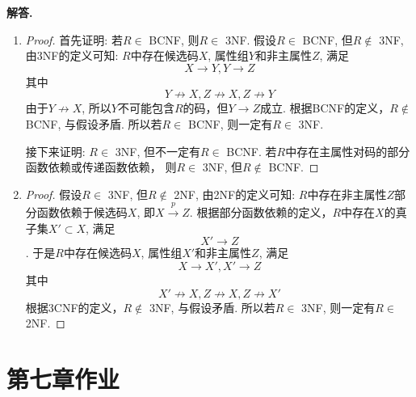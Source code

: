 \documentclass[12pt, oneside]{ctexart}
\numberwithin{figure}{section}
\numberwithin{table}{section}
\newcounter{problemname}
\newenvironment{solution}{\par\noindent\textbf{解答. }}{\par}
\begin{document}
\begin{solution}
        \begin{enumerate}[(1)]
            \item 
                \begin{proof} 
                    首先证明: 若$R\in$ BCNF, 则$R\in$ 3NF.\newline
                    假设$R\in$ BCNF, 但$R\not\in$ 3NF, 由3NF的定义可知:\newline 
                    $R$中存在候选码$X$, 属性组$Y$和非主属性$Z$, 满足
                    $$X \rightarrow Y, Y \rightarrow Z$$
                    其中$$Y \not\rightarrow X, Z \not\rightarrow X, Z \not\rightarrow Y$$
                    由于$Y \not\rightarrow X$, 所以$Y$不可能包含$R$的码，但$Y \rightarrow Z$成立.
                    根据BCNF的定义，$R\not\in$ BCNF, 与假设矛盾.\newline
                    所以若$R\in$ BCNF, 则一定有$R\in$ 3NF.\par
                    接下来证明: $R\in$ 3NF, 但不一定有$R\in$ BCNF.\newline
                    若$R$中存在主属性对码的部分函数依赖或传递函数依赖，\newline
                    则$R\in$ 3NF, 但$R\not\in$ BCNF.
                \end{proof}
            \item 
                \begin{proof}
                    假设$R\in$ 3NF, 但$R\not\in$ 2NF, 由2NF的定义可知:\newline
                    $R$中存在非主属性$Z$部分函数依赖于候选码$X$, 即$X \xrightarrow{p} Z$.\newline
                    根据部分函数依赖的定义，$R$中存在$X$的真子集$X' \subset X$, 满足
                    $$X' \rightarrow Z$$.
                    于是$R$中存在候选码$X$, 属性组$X'$和非主属性$Z$, 满足
                    $$X \rightarrow X', X' \rightarrow Z$$
                    其中$$X' \not\rightarrow X, Z \not\rightarrow X, Z \not\rightarrow X'$$
                    根据3CNF的定义，$R\not\in$ 3NF, 与假设矛盾.\newline
                    所以若$R\in$ 3NF, 则一定有$R\in$ 2NF.
                \end{proof}
        \end{enumerate}
\end{solution}

\newpage
\section{第七章作业}
\setcounter{problemname}{0}
\end{document}
